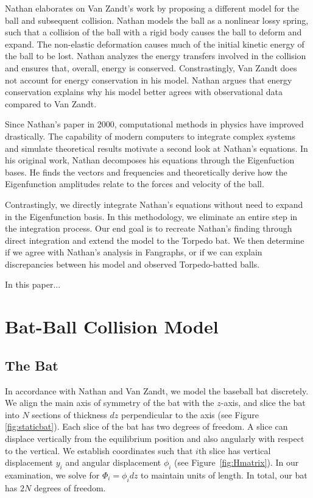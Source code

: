 \documentclass[linenumbers]{aastex7}
\begin{document}
Nathan elaborates on Van Zandt's work by proposing a different model for the ball and subsequent collision. Nathan models the ball as a nonlinear lossy spring, such that a collision of the ball with a rigid body causes the ball to deform and expand. The non-elastic deformation causes much of the initial kinetic energy of the ball to be lost. Nathan analyzes the energy transfers involved in the collision and ensures that, overall, energy is conserved. Constrastingly, Van Zandt does not account for energy conservation in his model. Nathan argues that energy conservation explains why his model better agrees with observational data compared to Van Zandt.


Since Nathan's paper in 2000, computational methods in physics have improved drastically. The capability of modern computers to integrate complex systems and simulate theoretical results motivate a second look at Nathan's equations. In his original work, Nathan decomposes his equations through the Eigenfuction bases. He finds the vectors and frequencies and theoretically derive how the Eigenfunction amplitudes relate to the forces and velocity of the ball. 

Contrastingly, we directly integrate Nathan's equations without need to expand in the Eigenfunction basis. In this methodology, we eliminate an entire step in the integration process. Our end goal is to recreate Nathan's finding through direct integration and extend the model to the Torpedo bat. We then determine if we agree with Nathan's analysis in Fangraphs, or if we can explain discrepancies between his model and observed Torpedo-batted balls. 


In this paper...
\section{Bat-Ball Collision Model}
\subsection{The Bat}
In accordance with Nathan and Van Zandt, we model the baseball bat discretely. We align the main axis of symmetry of the bat with the $z$-axis, and slice the bat into $N$ sections of thickness $dz$ perpendicular to the axis (see Figure \ref{fig:staticbat}). Each slice of the bat has two degrees of freedom. A slice can displace vertically from the equilibrium position and also angularly with respect to the vertical. We establish coordinates such that $i$th slice has vertical displacement $y_i$ and angular displacement $\phi_i$ (see Figure~\ref{fig:Hmatrix}). In our examination, we solve for $\Phi_i = \phi_i dz$ to maintain units of length. In total, our bat has $2N$ degrees of freedom.
\end{document}
